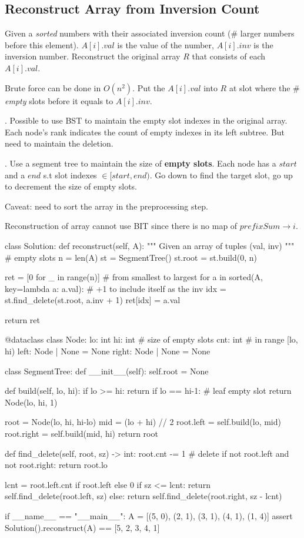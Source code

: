 \subsection{Reconstruct Array from Inversion Count}\label{inversionReconstruct}
Given a \textit{sorted} numbers with their associated inversion count (\# larger numbers before this element). $A[i].val$ is the value of the number, $A[i].inv$ is the inversion number. Reconstruct the original array $R$ that consists of each $A[i].val$.

Brute force can be done in $O(n^2)$. Put the $A[i].val$ into $R$ at slot where the \# \textit{empty} slots before it equals to $A[i].inv$.

. Possible to use BST to maintain the empty slot indexes in the original array. Each node's rank indicates the count of empty indexes in its left subtree. But need to maintain the deletion.  

. Use a segment tree to maintain the size of \textbf{empty slots}. Each node has a $start$ and a $end$ s.t slot indexes $\in [start, end)$. Go down to find the target slot, go up to decrement the size of empty slots. 

Caveat: need to sort the array in the preprocessing step. 

Reconstruction of array cannot use BIT since there is no map of $prefixSum \rightarrow i$.

\begin{python}
class Solution:
  def reconstruct(self, A):
    """
    Given an array of tuples (val, inv)
    """
    # empty slots
    n = len(A)
    st = SegmentTree()
    st.root = st.build(0, n)
    
    ret = [0 for _ in range(n)]
    # from smallest to largest
    for a in sorted(A, key=lambda a: a.val):
      # +1 to include itself as the inv
      idx = st.find_delete(st.root, a.inv + 1)
      ret[idx] = a.val

    return ret

@dataclass
class Node:
  lo: int
  hi: int
  # size of empty slots 
  cnt: int  # in range [lo, hi)
  left: Node | None = None
  right: Node | None = None

class SegmentTree:
  def __init__(self):
    self.root = None

  def build(self, lo, hi):
    if lo >= hi:
      return
    if lo == hi-1:
      # leaf empty slot
      return Node(lo, hi, 1)

    root = Node(lo, hi, hi-lo)
    mid = (lo + hi) // 2
    root.left = self.build(lo, mid)
    root.right = self.build(mid, hi)
    return root

  def find_delete(self, root, sz) -> int:
    root.cnt -= 1  # delete
    if not root.left and not root.right:
      return root.lo

    lcnt = root.left.cnt if root.left else 0
    if sz <= lcnt:
      return self.find_delete(root.left, sz)
    else:
      return self.find_delete(root.right, sz - lcnt)
    
if __name__ == "__main__":
  A = [(5, 0), (2, 1), (3, 1), (4, 1), (1, 4)]
  assert Solution().reconstruct(A) == [5, 2, 3, 4, 1]
\end{python}

